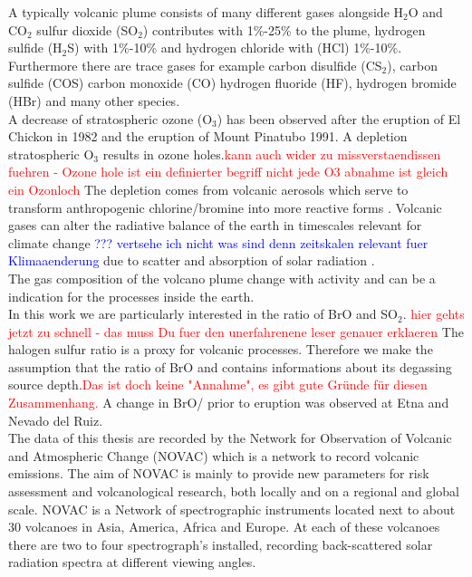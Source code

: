 A typically volcanic plume consists of many different gases alongside H$_2$O and CO$_2$  sulfur dioxide (SO$_2$) contributes with 1\%-25\% to the plume, hydrogen sulfide (H$_2$S) with 1\%-10\% and hydrogen chloride with (HCl) 1\%-10\%. Furthermore there are trace gases for example carbon disulfide (CS$_2$), carbon sulfide (COS) carbon monoxide (CO) hydrogen fluoride (HF), hydrogen bromide (HBr) and many other species. \cite{platt2015quantification}\\
%
A decrease of stratospheric ozone (O$_3$) has been observed after the eruption of  El Chickon in 1982 and the eruption of Mount Pinatubo 1991. A depletion stratospheric O$_3$ results in ozone holes.\textcolor{red}{kann auch wider zu missverstaendissen fuehren - Ozone hole ist ein definierter begriff nicht jede O3 abnahme ist gleich ein Ozonloch} The depletion comes from volcanic aerosols which serve to transform anthropogenic chlorine/bromine into more reactive forms \cite{solomon1998ozone}. 
%
Volcanic gases can alter the radiative balance of the earth in timescales relevant for climate change \textcolor{blue}{??? vertsehe ich nicht was sind denn zeitskalen relevant fuer Klimaaenderung} due to scatter and absorption of solar radiation \cite{schmidt2015volcanism}.\\
%
The gas composition of the volcano plume change with activity and can be a indication for the processes inside the earth.\\ 
%
In this work we are particularly interested in the ratio of BrO and SO$_2$.
\textcolor{red}{hier gehts jetzt zu schnell - das muss Du fuer den unerfahrenene leser genauer erklaeren} The halogen sulfur ratio is a proxy for volcanic processes. Therefore we make the assumption that the ratio of BrO and  contains informations about its degassing source depth.\textcolor{red}{Das ist doch keine "Annahme", es gibt gute Gründe für diesen Zusammenhang.} A change in BrO/ prior to eruption was observed at Etna and Nevado del Ruiz.\\
%
\newline
%
The data of this thesis are recorded by the Network for Observation of Volcanic and Atmospheric Change (NOVAC) which is a network to record volcanic emissions. The aim of NOVAC is mainly to provide new parameters for risk assessment and volcanological research, both locally and on a regional and global scale.
NOVAC is a Network of spectrographic instruments located next to about 30 volcanoes in Asia, America, Africa and Europe. At each of these volcanoes there are two to four spectrograph's installed, recording back-scattered solar radiation spectra at different viewing angles.\\
